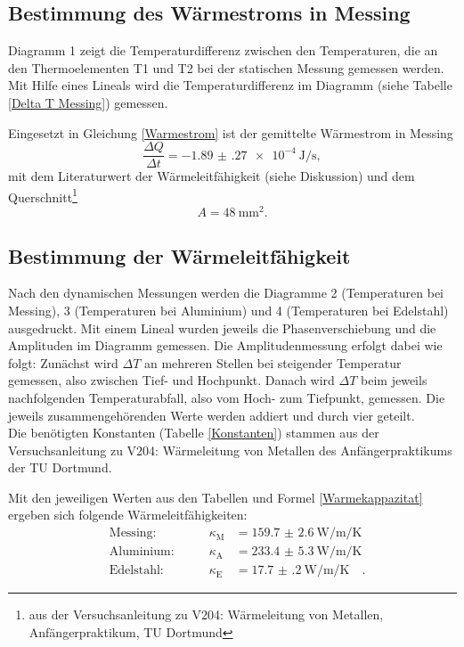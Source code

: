 \subsection{Bestimmung des Wärmestroms in Messing}
Diagramm 1 zeigt die Temperaturdifferenz zwischen den Temperaturen, die an den Thermoelementen T1 und T2 bei der statischen Messung gemessen werden. Mit Hilfe eines Lineals wird die Temperaturdifferenz im Diagramm (siehe Tabelle \ref{Delta T Messing}) gemessen.

Eingesetzt in Gleichung \eqref{Warmestrom} ist der gemittelte Wärmestrom in Messing
\begin{equation}
	\frac{\Delta Q}{\Delta t} = \SI{-1.89(27)e-4}{\joule\per\second},
\end{equation}
mit dem Literaturwert der Wärmeleitfähigkeit (siehe Diskussion) und dem Querschnitt\footnote{aus der Versuchsanleitung zu V204: Wärmeleitung von Metallen, Anfängerpraktikum, TU Dortmund}
\begin{equation}
	A = \SI{48}{\milli\metre\squared}.
\end{equation}
\clearpage

\subsection{Bestimmung der Wärmeleitfähigkeit}
Nach den dynamischen Messungen werden die Diagramme 2 (Temperaturen bei Messing), 3 (Temperaturen bei Aluminium) und 4 (Temperaturen bei Edelstahl) ausgedruckt. Mit einem Lineal wurden jeweils die Phasenverschiebung und die Amplituden im Diagramm gemessen. Die Amplitudenmessung erfolgt dabei wie folgt: Zunächst wird $\Delta T$ an mehreren Stellen bei steigender Temperatur gemessen, also zwischen Tief- und Hochpunkt. Danach wird $\Delta T$ beim jeweils nachfolgenden Temperaturabfall, also vom Hoch- zum Tiefpunkt, gemessen. Die jeweils zusammengehörenden Werte werden addiert und durch vier geteilt. \\
Die benötigten Konstanten (Tabelle \ref{Konstanten}) stammen aus der Versuchsanleitung zu V204: Wärmeleitung von Metallen des Anfängerpraktikums der TU Dortmund.







Mit den jeweiligen Werten aus den Tabellen und Formel \eqref{Warmekappazitat} ergeben sich folgende Wärmeleitfähigkeiten:
\begin{align}
	&\text{Messing:}\qquad & \kappa_\text{M} &= \SI{159.7(26)}{\watt\per\metre\per\kelvin} \\
	&\text{Aluminium:}\qquad & \kappa_\text{A} &= \SI{233.4(53)}{\watt\per\metre\per\kelvin} \\
	&\text{Edelstahl:}\qquad & \kappa_\text{E} &= \SI{17.7(2)}{\watt\per\metre\per\kelvin}\quad.
\end{align}


